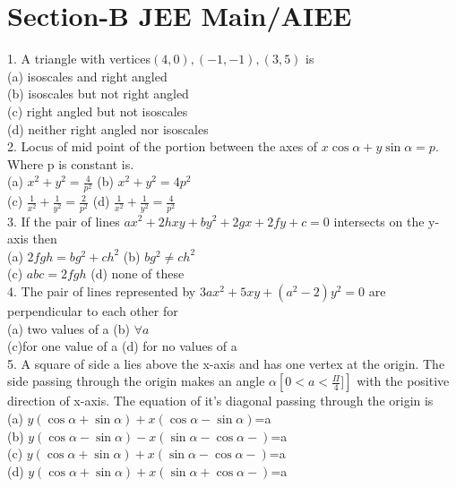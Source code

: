 \documentclass[12pt]{article}
\begin{document}
\section*{Section-B \hspace{1cm}   JEE Main/AIEE}


1. A triangle with vertices$(4,0),(-1,-1 ),(3,5)$ is\\
(a) isoscales and right angled\\
(b) isoscales  but not right angled\\
(c) right angled but not isoscales \\
(d) neither right angled nor isoscales \\
2. Locus of mid point of the portion between the axes of $x\cos\alpha+y\sin\alpha=p$. Where p is constant is.\\
(a) $x^2+y^2=\frac{4}{p^2}$ \hspace{1cm} (b) $x^2+y^2=4p^2$\\
(c) $\frac{1}{x^2}+\frac{1}{y^2}=\frac{2}{p^2}$ \hspace{1cm}(d) $\frac{1}{x^2}+\frac{1}{y^2}=\frac{4}{p^2}$ \\
3. If the pair of lines $ax^2+2hxy+by^2+2gx+2fy+c=0$ intersects on the y-axis then\\
(a) $2fgh=bg^2+ch^2$ \hspace{1cm} (b) $bg^2\neq ch^2$\\
(c) $abc=2fgh$\hspace{1cm}  (d) none of these\\
4. The pair of lines represented by $3ax^2+5xy+(a^2-2)y^2=0$ are perpendicular to each other for \\
(a) two values of a\hspace{1cm} (b) $\forall a$\\
(c)for one value of a \hspace{1cm} (d) for no values of a\\
5. A square of side a lies above the x-axis and has one vertex at the origin. The side passing through the origin makes an angle $\alpha \left[ 0<a<\frac{\Pi}{4}]\right]$ with the positive direction of x-axis. The equation of it's diagonal passing through the origin is \\
(a) $y(\cos\alpha+\sin\alpha)+x(\cos\alpha-\sin\alpha)$=a\\
(b) $y(\cos\alpha-\sin\alpha)-x(\sin\alpha-\cos\alpha-)$=a\\
(c) $y(\cos\alpha+\sin\alpha)+x(\sin\alpha-\cos\alpha-)$=a\\
(d) $y(\cos\alpha+\sin\alpha)+x(\sin\alpha+\cos\alpha-)$=a\\
\end{document}
